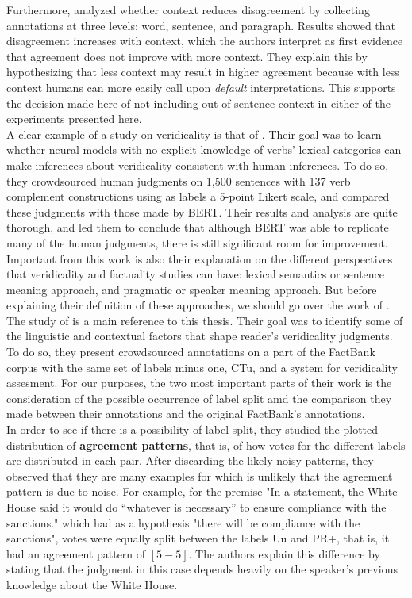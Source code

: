 Furthermore, \citet{pavlick2019inherent} analyzed whether context reduces disagreement by collecting annotations at three levels: word, sentence, and paragraph. Results showed that disagreement increases with context, which the authors interpret as first evidence that agreement does not improve with more context. They explain this by hypothesizing that less context may result in higher agreement because with less context humans can more easily call upon \textit{default} interpretations. This supports the decision made here of not including out-of-sentence context in either of the experiments presented here.\\

A clear example of a study on veridicality is that of \citet{ross2019well}. Their goal was to learn whether neural models with no explicit knowledge of verbs' lexical categories can make inferences about veridicality consistent with human inferences. To do so, they crowdsourced human judgments on 1,500 sentences with 137 verb complement constructions using as labels a 5-point Likert scale, and compared these judgments with those made by BERT. Their results and analysis are quite thorough, and led them to conclude that although BERT was able to replicate many of the human judgments, there is still significant room for improvement. Important from this work is also their explanation on the different perspectives that veridicality and factuality studies can have: lexical semantics or sentence meaning approach, and pragmatic or speaker meaning approach. But before explaining their definition of these approaches, we should go over the work of \citet{de2012did}.\\

The study of \citet{de2012did} is a main reference to this thesis. Their goal was to identify some of the linguistic and contextual factors that shape reader's veridicality judgments. To do so, they present crowdsourced annotations on a part of the FactBank corpus with the same set of labels minus one, CTu, and a system for veridicality assesment. For our purposes, the two most important parts of their work is the consideration of the possible occurrence of label split amd the comparison they made between their annotations and the original FactBank's annotations.\\

In order to see if there is a possibility of label split, they studied the plotted distribution of \textbf{agreement patterns}, that is, of how votes for the different labels are distributed in each pair. After discarding the likely noisy patterns, they observed that they are many examples for which is unlikely that the agreement pattern is due to noise. For example, for the premise "In a statement, the White House said it would do “whatever is necessary” to ensure compliance with the sanctions." which had as a hypothesis "there will be compliance with the sanctions", votes were equally split between the labels Uu and PR+, that is, it had an agreement pattern of $[5-5]$. The authors explain this difference by stating that the judgment in this case depends heavily on the speaker's previous knowledge about the White House.\\ 

